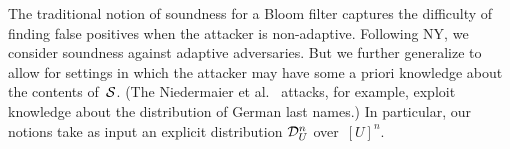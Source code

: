 %
%
%
The traditional notion of soundness for a Bloom filter captures the difficulty of finding false positives when the attacker is non-adaptive. Following NY, we consider soundness against adaptive adversaries. But we further generalize to allow for settings in which the attacker may have some a priori knowledge about the contents of~${\cal S}$. (The Niedermaier et al.~\cite{xxx} attacks, for example, exploit knowledge about the distribution of German last names.) In particular, our notions take as input an explicit distribution $\mathcal{D}_{U}^{n}$ over~$[U]^n$.

%


